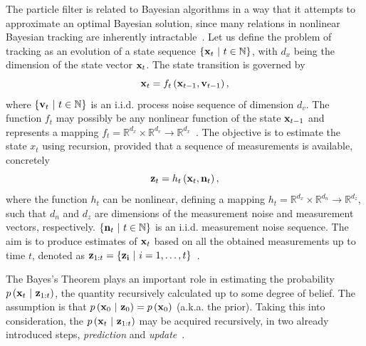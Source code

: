 The particle filter is related to Bayesian algorithms in a way that it attempts to approximate an optimal Bayesian solution, since many relations in nonlinear Bayesian tracking are inherently intractable~\cite{arulampalam2007particlefilter}. Let us define the problem of tracking as an evolution of a state sequence $\left\{ {\mathbf{x}_t \ | \ t \in \mathbb{N}} \right\}$, with $d_x$ being the dimension of the state vector $\mathbf{x}_t$. The state transition is governed by
\begin{equation}
    \label{eq:ProbModelStateEvolution}
    \mathbf{x}_t = {f_t} \left( \mathbf{x}_{t - 1}, \mathbf{v}_{t - 1} \right),
\end{equation}
where $\left\{ {\mathbf{v}_t \ | \ t \in \mathbb{N}} \right\}$ is an i.i.d. process noise sequence of dimension $d_v$. The function $f_t$ may possibly be any nonlinear function of the state $\mathbf{x}_{t - 1}$ and represents a mapping $f_t = \mathbb{R}^{d_x} \times \mathbb{R}^{d_v} \to \mathbb{R}^{d_x}$~\cite{arulampalam2007particlefilter}. The objective is to estimate the state $x_t$ using recursion, provided that a sequence of measurements is available, concretely
\begin{equation}
    \mathbf{z}_t = {h_t} \left( \mathbf{x}_t, \mathbf{n}_t \right),
\end{equation}
where the function $h_t$ can be nonlinear, defining a mapping $h_t = \mathbb{R}^{d_x} \times \mathbb{R}^{d_n} \to \mathbb{R}^{d_z}$, such that $d_n$ and $d_z$ are dimensions of the measurement noise and measurement vectors, respectively. $\left\{ {\mathbf{n}_t \ | \ t \in \mathbb{N}} \right\}$ is an i.i.d. measurement noise sequence. The aim is to produce estimates of $\mathbf{x}_t$ based on all the obtained measurements up to time $t$, denoted as $\mathbf{z}_{1:t} = \left\{ {\mathbf{z_i} \ | \ i = 1, \dots, t} \right\}$~\cite{arulampalam2007particlefilter}.

The Bayes's Theorem plays an important role in estimating the probability $p \left( \mathbf{x}_t \ | \ \mathbf{z}_{1:t} \right)$, the quantity recursively calculated up to some degree of belief. The assumption is that $p \left( \mathbf{x}_0 \ | \ \mathbf{z}_0 \right) = p \left( \mathbf{x}_0 \right)$ (a.k.a. the prior). Taking this into consideration, the $p \left( \mathbf{x}_t \ | \ \mathbf{z}_{1:t} \right)$ may be acquired recursively, in two already introduced steps, \emph{prediction} and \emph{update}~\cite{arulampalam2007particlefilter}.

